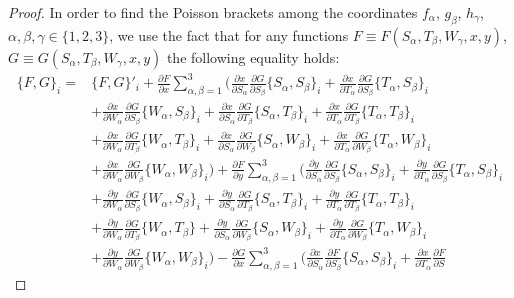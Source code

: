 \documentclass[10pt,a4paper]{amsart}
\def\a{\alpha}
\def\b{\beta}
\def\g{\gamma}
\numberwithin{equation}{section}
\begin{document}
\begin{proof}
In order to find the Poisson brackets among the coordinates $f_{\a}$, $g_{\b}$, $h_{\g}$, $\a,\b,\g \in \{1,2,3\}$, we use the fact that for any functions $F\equiv F(S_{\a}, T_{\b}, W_{\g}, x,y)$, $G\equiv G(S_{\a}, T_{\b}, W_{\g}, x, y)$ the following equality holds:
\begin{align*}%
\{ F, G \}_i={}&\{ F, G \}'_i+
\frac{\partial F}{ \partial x}\sum\limits_{\a,\b=1}^3\biggl( \frac{\partial x}{\partial S_{ \a}}
\frac{\partial G}{\partial S_{ \b}}\{S_{\a},S_{\b}\}_i+
\frac{\partial x}{\partial T_{ \a}} \frac{\partial G}{\partial S_{
\b}}\{T_{\a},S_{\b}\}_i\\
&
+ \frac{\partial x}{\partial W_{ \a}}
\frac{\partial G}{\partial S_{ \b}}\{W_{\a},S_{\b}\}_i +\frac{\partial x}{\partial S_{ \a}}
\frac{\partial G}{\partial T_{ \b}}\{S_{\a},T_{\b}\}_i+ \frac{\partial x}{\partial T_{ \a}} \frac{\partial G}{\partial
T_{ \b}}\{T_{\a},T_{\b}\}_i
\\
& +\frac{\partial x}{\partial W_{ \a}}
\frac{\partial G}{\partial T_{ \b}}\{W_{\a},T_{\b}\}_i
+ \frac{\partial x}{\partial S_{ \a}}
\frac{\partial G}{\partial W_{ \b}}\{S_{\a},W_{\b}\}_i+\frac{\partial x}{\partial T_{ \a}} \frac{\partial G}{\partial
W_{ \b}}\{T_{\a},W_{\b}\}_i\\
&+ \frac{\partial x}{\partial W_{ \a}}
\frac{\partial G}{\partial W_{ \b}}\{W_{\a},W_{\b}\}_i \biggr)+
\frac{\partial F}{ \partial y}
\sum\limits_{\a,\b=1}^3 \biggl( \frac{\partial y}{\partial S_{ \a}}
\frac{\partial G}{\partial S_{ \b}}\{S_{\a},S_{\b}\}_i+
\frac{\partial y}{\partial T_{ \a}} \frac{\partial G}{\partial S_{
\b}}\{T_{\a},S_{\b}\}_i\\
& +
 \frac{\partial y}{\partial W_{ \a}}
\frac{\partial G}{\partial S_{ \b}}\{W_{\a},S_{\b}\}_i+ \frac{\partial y}{\partial S_{ \a}}
\frac{\partial G}{\partial T_{ \b}}\{S_{\a},T_{\b}\}_i
+
 \frac{\partial y}{\partial T_{ \a}} \frac{\partial G}{\partial
T_{ \b}}\{T_{\a},T_{\b}\}_i\\
& +
\frac{\partial y}{\partial W_{ \a}}
\frac{\partial G}{\partial T_{ \b}}\{W_{\a},T_{\b}\}
+ \frac{\partial y}{\partial S_{ \a}}
\frac{\partial G}{\partial W_{ \b}}\{S_{\a},W_{\b}\}_i+
 \frac{\partial y}{\partial T_{ \a}} \frac{\partial G}{\partial
W_{ \b}}\{T_{\a},W_{\b}\}_i\\
&+ \frac{\partial y}{\partial W_{ \a}}
\frac{\partial G}{\partial W_{ \b}}\{W_{\a},W_{\b}\}_i \biggr)-
 \frac{\partial G}{ \partial x} \sum\limits_{\a,\b=1}^3 \biggl( \frac{\partial x}{\partial S_{ \a}}
\frac{\partial F}{\partial S_{ \b}}\{S_{\a},S_{\b}\}_i
+\frac{\partial x}{\partial T_{ \a}} \frac{\partial F}{\partial S_{
}}
\end{align*}
\end{proof}
\end{document}
